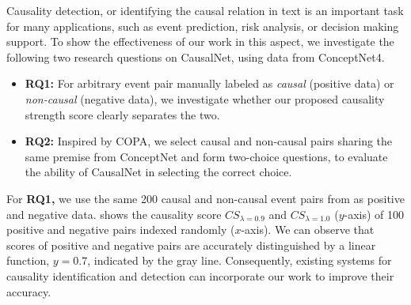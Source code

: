 Causality detection, or identifying the causal relation in text is
an important task for many applications, such as event prediction,
risk analysis, or decision making support\cite{mirza2014extracting}.
To show the effectiveness of our work in this aspect,
we investigate the following two research questions on
CausalNet, using data from ConceptNet4.
\begin{itemize}
\item {\bf RQ1:}
For arbitrary event pair manually labeled as \emph{causal} (positive data)
or \emph{non-causal} (negative data), we investigate whether our
proposed causality strength score clearly separates the two.
\item {\bf RQ2:} Inspired by COPA, we select causal and non-causal pairs
sharing the same premise from ConceptNet and form two-choice
questions, to evaluate the ability of CausalNet in selecting the
correct choice.
\end{itemize}

For {\bf RQ1,}
we use the same 200 causal and non-causal event pairs from
 as positive and negative data.
shows the causality score $CS_{\lambda=0.9}$ and $CS_{\lambda=1.0}$ ($y$-axis)
of 100 positive
and negative pairs indexed randomly ($x$-axis).
We can observe that scores
of positive and negative pairs are accurately distinguished by a
linear function, %
$y=0.7$, indicated by the gray line.
Consequently, existing systems for causality identification and detection
can incorporate our work to improve their accuracy.

